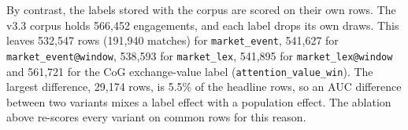 By contrast, the labels stored with the corpus are scored on their own rows. The v3.3 corpus holds
566,452 engagements, and each label drops its own draws. This leaves 532,547 rows (191,940
matches) for \texttt{market\_event}, 541,627 for \texttt{market\_event@window}, 538,593 for
\texttt{market\_lex}, 541,895 for \texttt{market\_lex@window} and 561,721 for the CoG exchange-value
label (\texttt{attention\_value\_win}).
The largest difference, 29,174 rows, is 5.5\% of the headline rows, so an AUC difference between
two variants mixes a label effect with a population effect. The ablation above re-scores every
variant on common rows for this reason.

